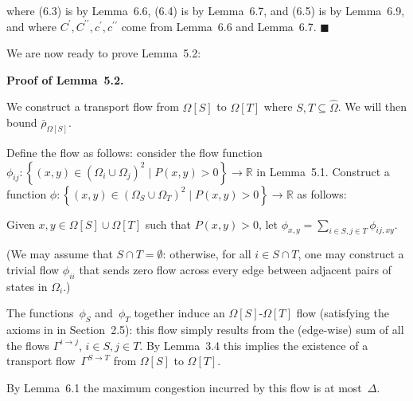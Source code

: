 \documentclass[10pt,a4paper]{article}
\begin{document}
where (6.3) is by Lemma 6.6, (6.4) is by Lemma 6.7, and (6.5) is by Lemma 6.9, and where $C^{\prime},C^{\prime\prime},c^{\prime},c^{\prime\prime}$ come from Lemma 6.6 and Lemma 6.7.
\ensuremath{\blacksquare}\par





We are now ready to prove Lemma 5.2:\par




\par\medskip\noindent\textbf{Proof of Lemma 5.2.}\par



We construct a transport flow from $\Omega[S]$ to $\Omega[T]$ where $S,T\subseteq\hat{\Omega}$. We will then bound $\bar{\rho}_{\Omega[S]}$.\par




Define the flow as follows: consider the flow function $\phi_{ij}:\left\{(x,y)\in(\Omega_{i}\cup\Omega_{j})^{2}\mid P(x,y)>0\right\}\rightarrow\mathbb{R}$ in Lemma 5.1. Construct a function $\phi:\left\{(x,y)\in(\Omega_{S}\cup\Omega_{T})^{2}\mid P(x,y)>0\right\}\rightarrow\mathbb{R}$ as follows:\par




Given $x,y\in\Omega[S]\cup\Omega[T]$ such that $P(x,y)>0$, let $\phi_{x,y}=\sum_{i\in S,j\in T}\phi_{ij,xy}$.\par




(We may assume that $S\cap T=\emptyset$: otherwise, for all $i\in S\cap T$, one may construct a trivial flow $\phi_{ii}$ that sends zero flow across every edge between adjacent pairs of states in $\Omega_{i}$.)\par




The functions $\phi_{S}$ and $\phi_{T}$ together induce an $\Omega[S]$-$\Omega[T]$ flow (satisfying the axioms in in Section 2.5): this flow simply results from the (edge-wise) sum of all the flows $\Gamma^{i\rightarrow j}$, $i\in S,j\in T$. By Lemma 3.4 this implies the existence of a transport flow $\Gamma^{S\rightarrow T}$ from $\Omega[S]$ to $\Omega[T]$.\par




By Lemma 6.1 the maximum congestion incurred by this flow is at most $\Delta$.\par
\end{document}
